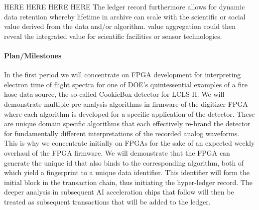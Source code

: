 \documentclass{article}
\begin{document}

HERE HERE HERE HERE 
The ledger record furthermore allows for dynamic data retention whereby lifetime in archive can scale with the scientific or social value derived from the data and/or algorithm.
value aggregation could then reveal the integrated value for scientific facilities or sensor technologies.


\paragraph{Plan/Milestones}
In the first period we will concentrate on FPGA development for interpreting electron time of flight spectra for one of DOE's quintessential examples of a fire hose data source, the so-called CookieBox detector for LCLS-II.
We will demonstrate multiple pre-analysis algorithms in firmware of the digitizer FPGA where each algorithm is developed for a specific application of the detector.
These are unique domain specific algorithms that each effectively re-brand the detector for fundamentally different interpretations of the recorded analog waveforms.
This is why we concentrate initially on FPGAs for the sake of an expected weekly overhaul of the FPGA firmware.
We will demonstrate that the FPGA can generate the unique id that also binds to the corresponding algorithm, both of which yield a fingerprint to a unique data identifier.
This identifier will form the initial block in the transaction chain, thus initiating the hyper-ledger record.
The deeper analysis in subsequent AI acceleration chips that follow will then be treated as subsequent transactions that will be added to the ledger.
\end{document}
